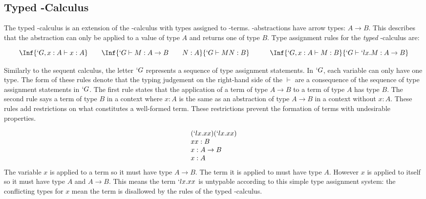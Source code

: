   \subsection{Typed \lam-Calculus}
  The typed \lam-calculus is an extension of the \lam-calculus with types assigned to \lam-terms.
  \lam-abstractions have arrow types: $A \to B$.
  This describes that the abstraction can only be applied to a value of type $A$ and returns one of type $B$.
  Type assignment rules for the \emph{typed} \lam-calculus are:

  \[
  \begin{array}{c@{\quad\quad}c@{\quad\quad\quad}c}
    \Inf{ `G,x:A \vdash x : A }
    &
    \Inf{
      `G \vdash M : A \to B \hspace{20pt} N:A 
    }{
      `G \vdash M N : B 
    }
    &
    \Inf{
      `G,x:A \vdash M : B
    }{
      `G \vdash `lx.M : A \to B 
    }
    \vspace{5pt}
    \end{array}
  \]
  Similarly to the sequent calculus, 
  the letter $`G$ represents a sequence of type assignment statements.
  In $`G$, each variable can only have one type.
  The form of these rules denote that the typing judgement on the right-hand side of the $\vdash$ are a consequence of the sequence of type assignment statements in $`G$.
  The first rule states that the application of a term of type $A \to B$ to
  a term of type $A$ has type $B$. 
  The second rule says a term of type $B$ in a context where $x:A$ is the same as an abstraction of type $A \to B$ in a context without $x:A$. 
  These rules add restrictions on what constitutes a well-formed term.
  These restrictions prevent the formation of terms with undesirable properties.  
  
  \begin{example}
  \[  
  \begin{array}{lr}
    (`lx.xx)(`lx.xx) \\
    xx : B \\
    x : A \to B \\
    x : A
  \end{array}
  \]
  The variable $x$ is applied to a term so it must have type $A \to B$.
  The term it is applied to must have type $A$.
  However $x$ is applied to itself so it must have type $A$ and $A \to B$.
  This means the term $`lx.xx$ is untypable according to this simple type assignment system:
  the conflicting types for $x$ mean the term is disallowed by the rules of the typed \lam-calculus.
  \end{example}
 

